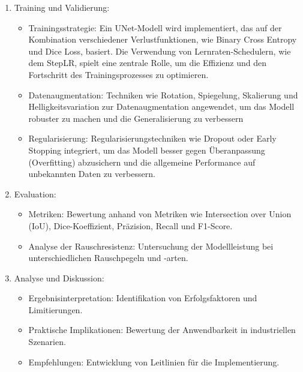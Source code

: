 \begin{enumerate}
    \item Training und Validierung:
    \begin{itemize}
        \item Trainingsstrategie: Ein UNet-Modell wird implementiert, das auf der Kombination verschiedener Verlustfunktionen, wie Binary Cross Entropy und Dice Loss, basiert. Die Verwendung von Lernraten-Schedulern, wie dem StepLR, spielt eine zentrale Rolle, um die Effizienz und den Fortschritt des Trainingsprozesses zu optimieren.
        \item Datenaugmentation: Techniken wie Rotation, Spiegelung, Skalierung und Helligkeitsvariation zur Datenaugmentation angewendet, um das Modell robuster zu machen und die Generalisierung zu verbessern 
        \item Regularisierung: Regularisierungstechniken wie Dropout oder Early Stopping integriert, um das Modell besser gegen Überanpassung (Overfitting) abzusichern und die allgemeine Performance auf unbekannten Daten zu verbessern.
    \end{itemize}

    \item Evaluation:
    \begin{itemize}
        \item Metriken: Bewertung anhand von Metriken wie Intersection over Union (IoU), Dice-Koeffizient, Präzision, Recall und F1-Score.
        \item Analyse der Rauschresistenz: Untersuchung der Modellleistung bei unterschiedlichen Rauschpegeln und -arten.
    \end{itemize}
    
    \item Analyse und Diskussion:
    \begin{itemize}
        \item Ergebnisinterpretation: Identifikation von Erfolgsfaktoren und Limitierungen.
        \item Praktische Implikationen: Bewertung der Anwendbarkeit in industriellen Szenarien.
        \item Empfehlungen: Entwicklung von Leitlinien für die Implementierung.
    \end{itemize}
    
\end{enumerate}